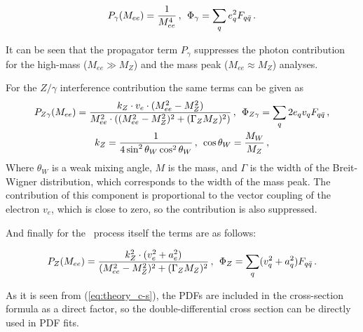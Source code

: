 \begin{equation}
P_{\gamma}(M_{ee}) = \frac{1}{M^{4}_{ee}}\,,\,\;\Phi_{\gamma} = \sum_{q} e^{2}_{q} F_{q\bar{q}} \,.
\end{equation}

It can be seen that the propagator term $P_{\gamma}$ suppresses the photon contribution for the high-mass ($M_{ee} \gg M_{Z}$) and the mass peak ($M_{ee} \approx M_{Z}$) analyses.

For the $Z/\gamma$ interference contribution the same terms can be given as
\begin{equation}
\begin{gathered}
P_{Z\gamma}(M_{ee}) = \frac{k_{Z} \cdot v_{e} \cdot (M_{ee}^{2} - M_{Z}^{2})}{M_{ee}^{2} \cdot ((M_{ee}^{2} - M_{Z}^{2})^{2} + (\Gamma_{Z}M_{Z})^{2})}\,,\,\;
\Phi_{Z\gamma} = \sum_{q} 2e_{q}v_{q} F_{q\bar{q}} \,,\\
k_{Z} = \frac{1}{4\sin^{2}\theta_W\cos^{2}\theta_W} \,, \,\; \cos\theta_W = \frac{M_{W}}{M_{Z}} \,,
\end{gathered}
\end{equation}
Where $\theta_{W}$ is a weak mixing angle, $M$ is the mass, and $\Gamma$ is the width of the Breit-Wigner distribution, which corresponds to the width of the mass peak. The contribution of this component is proportional to the vector coupling of the electron $v_{e}$, which is close to zero, so the contribution is also suppressed.

And finally for the \Zee\ process itself the terms are as follows:

\begin{equation}
P_{Z}(M_{ee}) = \frac{k^{2}_{Z} \cdot (v^{2}_{e} + a^{2}_{e})}{(M^{2}_{ee} - M^{2}_{Z})^{2} + (\Gamma_{Z}M_{Z})^{2}}\,,\,\;
\Phi_{Z} = \sum_{q} (v^{2}_{q} + a^{2}_{q}) F_{q\bar{q}} \,.
\end{equation}

As it is seen from (\ref{eq:theory_c-s}), the PDFs are included in the cross-section formula as a direct factor, so the double-differential cross section can be directly used in PDF fits.

\begin{figure}
\end{figure}

